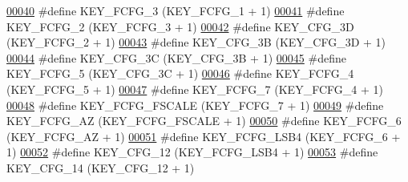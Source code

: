 \begin{DoxyCode}
\hypertarget{dmp_key_8h_source.tex_l00040}{}\hyperlink{dmp_key_8h_a2857c6fba1bb99df3e5f6da3e9b85a52}{00040} \textcolor{preprocessor}{#define KEY\_FCFG\_3                  (KEY\_FCFG\_1 + 1)}
\hypertarget{dmp_key_8h_source.tex_l00041}{}\hyperlink{dmp_key_8h_ac6bad3ac6c9d72158389154551e1bd45}{00041} \textcolor{preprocessor}{#define KEY\_FCFG\_2                  (KEY\_FCFG\_3 + 1)}
\hypertarget{dmp_key_8h_source.tex_l00042}{}\hyperlink{dmp_key_8h_a364597bae86eafc8fd74a851c1ad737c}{00042} \textcolor{preprocessor}{#define KEY\_CFG\_3D                  (KEY\_FCFG\_2 + 1)}
\hypertarget{dmp_key_8h_source.tex_l00043}{}\hyperlink{dmp_key_8h_a0e803abade5497b66f0f72a52dfa47b1}{00043} \textcolor{preprocessor}{#define KEY\_CFG\_3B                  (KEY\_CFG\_3D + 1)}
\hypertarget{dmp_key_8h_source.tex_l00044}{}\hyperlink{dmp_key_8h_af7e7b99c7694ffada093356f6f23dd0b}{00044} \textcolor{preprocessor}{#define KEY\_CFG\_3C                  (KEY\_CFG\_3B + 1)}
\hypertarget{dmp_key_8h_source.tex_l00045}{}\hyperlink{dmp_key_8h_a24055723a9605fc056840bfa4b3099e2}{00045} \textcolor{preprocessor}{#define KEY\_FCFG\_5                  (KEY\_CFG\_3C + 1)}
\hypertarget{dmp_key_8h_source.tex_l00046}{}\hyperlink{dmp_key_8h_af41ef0867f5403642cedca80fd269a69}{00046} \textcolor{preprocessor}{#define KEY\_FCFG\_4                  (KEY\_FCFG\_5 + 1)}
\hypertarget{dmp_key_8h_source.tex_l00047}{}\hyperlink{dmp_key_8h_adac5dd01ac0d30282f2346095867d09c}{00047} \textcolor{preprocessor}{#define KEY\_FCFG\_7                  (KEY\_FCFG\_4 + 1)}
\hypertarget{dmp_key_8h_source.tex_l00048}{}\hyperlink{dmp_key_8h_aa2d4b9ea9c8e0e82fa0cbde09c6c99d1}{00048} \textcolor{preprocessor}{#define KEY\_FCFG\_FSCALE             (KEY\_FCFG\_7 + 1)}
\hypertarget{dmp_key_8h_source.tex_l00049}{}\hyperlink{dmp_key_8h_a3c8c999449db24e646889bde950408a1}{00049} \textcolor{preprocessor}{#define KEY\_FCFG\_AZ                 (KEY\_FCFG\_FSCALE + 1)}
\hypertarget{dmp_key_8h_source.tex_l00050}{}\hyperlink{dmp_key_8h_a6d42a94e25bf38609e89a2259694f8db}{00050} \textcolor{preprocessor}{#define KEY\_FCFG\_6                  (KEY\_FCFG\_AZ + 1)}
\hypertarget{dmp_key_8h_source.tex_l00051}{}\hyperlink{dmp_key_8h_a2a8a7369e21b3e6446ac417a9f767e10}{00051} \textcolor{preprocessor}{#define KEY\_FCFG\_LSB4               (KEY\_FCFG\_6 + 1)}
\hypertarget{dmp_key_8h_source.tex_l00052}{}\hyperlink{dmp_key_8h_ab51fcfee1074d4d953ec3ea5bec99509}{00052} \textcolor{preprocessor}{#define KEY\_CFG\_12                  (KEY\_FCFG\_LSB4 + 1)}
\hypertarget{dmp_key_8h_source.tex_l00053}{}\hyperlink{dmp_key_8h_a57b6b7e9d0d35132440e8a7c09a93d16}{00053} \textcolor{preprocessor}{#define KEY\_CFG\_14                  (KEY\_CFG\_12 + 1)}

\end{DoxyCode}
